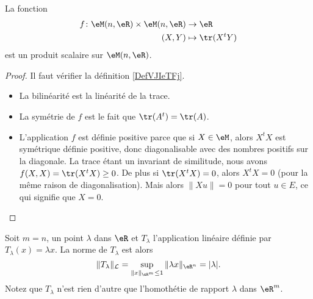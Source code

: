 \begin{proposition} \label{PropMAQoKAg}
    La fonction
    \begin{equation}
        \begin{aligned}
            f\colon \eM(n,\eR)\times \eM(n,\eR)&\to \eR \\
            (X,Y)&\mapsto \tr(X^tY) 
        \end{aligned}
    \end{equation}
    est un produit scalaire sur \( \eM(n,\eR)\).
\end{proposition}

\begin{proof}
    Il faut vérifier la définition \ref{DefVJIeTFj}.
    \begin{itemize}
        \item La bilinéarité est la linéarité de la trace.
        \item La symétrie de \( f\) est le fait que \( \tr(A^t)=\tr(A)\).
        \item L'application \( f\) est définie positive parce que si \( X\in \eM\), alors \( X^tX\) est symétrique définie positive, donc diagonalisable avec des nombres positifs sur la diagonale. La trace étant un invariant de similitude, nous avons \( f(X,X)=\tr(X^tX)\geq 0\). De plus si \( \tr(X^tX)=0\), alors \( X^tX=0\) (pour la même raison de diagonalisation). Mais alors \( \| Xu \|=0\) pour tout \( u\in E\), ce qui signifie que \( X=0\).
    \end{itemize}
\end{proof}

\begin{example}
	Soit $m=n$, un point $\lambda$ dans $\eR$ et $T_{\lambda}$ l'application linéaire définie par $T_{\lambda}(x)=\lambda x$. La norme de $T_{\lambda}$ est alors
\[
\|T_{\lambda}\|_{\mathcal{L}}=\sup_{\|x\|_{\eR^m}\leq 1}\|\lambda x\|_{\eR^n}= |\lambda|.
\]
Notez que $T_{\lambda}$ n'est rien d'autre que l'homothétie de rapport $\lambda$ dans $\eR^m$.
\end{example}

